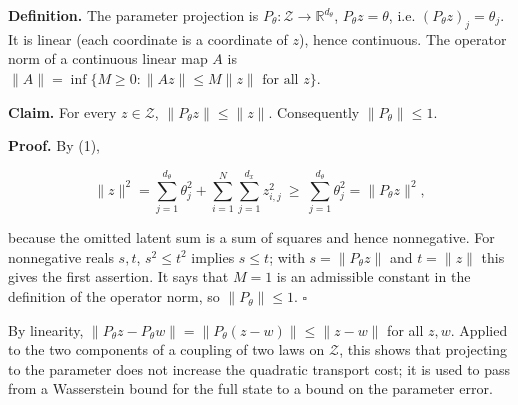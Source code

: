 \documentclass[11pt,a4paper]{report}
\begin{document}
\textbf{Definition.} The parameter projection is \(P_\theta:\mathcal Z\to\mathbb R^{d_\theta}\), \(P_\theta z=\theta\), i.e. \((P_\theta z)_j=\theta_j\). It is linear (each coordinate is a coordinate of \(z\)), hence continuous. The operator norm of a continuous linear map \(A\) is \(\|A\|=\inf\{M\ge0:\|Az\|\le M\|z\|\text{ for all }z\}\).




\textbf{Claim.} For every \(z\in\mathcal Z\), \(\|P_\theta z\|\le\|z\|\). Consequently \(\|P_\theta\|\le1\).




\textbf{Proof.} By (1),


\[\|z\|^2=\sum_{j=1}^{d_\theta}\theta_j^2+\sum_{i=1}^N\sum_{j=1}^{d_x}z_{i,j}^2\ \ge\ \sum_{j=1}^{d_\theta}\theta_j^2=\|P_\theta z\|^2,\]


because the omitted latent sum is a sum of squares and hence nonnegative. For nonnegative reals \(s,t\), \(s^2\le t^2\) implies \(s\le t\); with \(s=\|P_\theta z\|\) and \(t=\|z\|\) this gives the first assertion. It says that \(M=1\) is an admissible constant in the definition of the operator norm, so \(\|P_\theta\|\le1\). \(\square\)




By linearity, \(\|P_\theta z-P_\theta w\|=\|P_\theta(z-w)\|\le\|z-w\|\) for all \(z,w\). Applied to the two components of a coupling of two laws on \(\mathcal Z\), this shows that projecting to the parameter does not increase the quadratic transport cost; it is used to pass from a Wasserstein bound for the full state to a bound on the parameter error.
\end{document}
